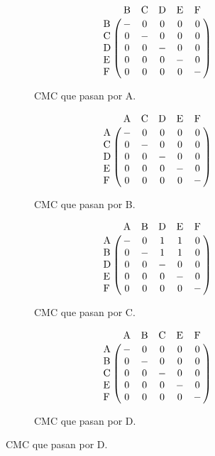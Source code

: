 \begin{figure}[htpb]
  \centering
  \begin{subfigure}[b]{.3\textwidth}
    \begin{equation*}
      \bordermatrix{
       ~  & $B$ & $C$ & $D$ & $E$ & $F$ \cr
      $B$ &  -  &  0  &  0  &  0  &  0  \cr
      $C$ &  0  &  -  &  0  &  0  &  0  \cr
      $D$ &  0  &  0  &  -  &  0  &  0  \cr
      $E$ &  0  &  0  &  0  &  -  &  0  \cr
      $F$ &  0  &  0  &  0  &  0  &  -  \cr
    }
    \end{equation*}
    \caption{CMC que pasan por A.}
    \label{fig:sppn:a}
  \end{subfigure}
  \hspace{3mm}
  \begin{subfigure}[b]{.3\textwidth}
    \begin{equation*}
      \bordermatrix{
       ~  & $A$ & $C$ & $D$ & $E$ & $F$ \cr
      $A$ &  -  &  0  &  0  &  0  &  0  \cr
      $C$ &  0  &  -  &  0  &  0  &  0  \cr
      $D$ &  0  &  0  &  -  &  0  &  0  \cr
      $E$ &  0  &  0  &  0  &  -  &  0  \cr
      $F$ &  0  &  0  &  0  &  0  &  -  \cr
    }
    \end{equation*}
    \caption{CMC que pasan por B.}
    \label{fig:sppn:b}
  \end{subfigure}
  \hspace{3mm}
  \begin{subfigure}[b]{.3\textwidth}
    \begin{equation*}
      \bordermatrix{
       ~  & $A$ & $B$ & $D$ & $E$ & $F$ \cr
      $A$ &  -  &  0  &  1  &  1  &  0  \cr
      $B$ &  0  &  -  &  1  &  1  &  0  \cr
      $D$ &  0  &  0  &  -  &  0  &  0  \cr
      $E$ &  0  &  0  &  0  &  -  &  0  \cr
      $F$ &  0  &  0  &  0  &  0  &  -  \cr
    }
    \end{equation*}
    \caption{CMC que pasan por C.}
    \label{fig:sppn:c}
  \end{subfigure}
  \hspace{3mm}
  \begin{subfigure}[b]{.3\textwidth}
    \begin{equation*}
      \bordermatrix{
       ~  & $A$ & $B$ & $C$ & $E$ & $F$ \cr
      $A$ &  -  &  0  &  0  &  0  &  0  \cr
      $B$ &  0  &  -  &  0  &  0  &  0  \cr
      $C$ &  0  &  0  &  -  &  0  &  0  \cr
      $E$ &  0  &  0  &  0  &  -  &  0  \cr
      $F$ &  0  &  0  &  0  &  0  &  -  \cr
    }
    \end{equation*}
    \caption{CMC que pasan por D.}
    \label{fig:sppn:d}

\end{subfigure}
\end{figure}

